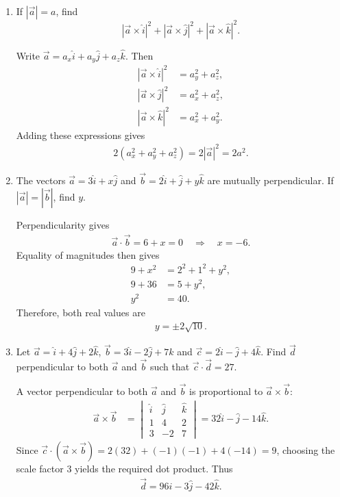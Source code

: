 \begin{enumerate}[label=\thesubsection.\arabic*,ref=\thesubsection.\theenumi]
\item If $|\vec a|=a$, find
\[
 |\vec a\times\hat i|^2+|\vec a\times\hat j|^2+|\vec a\times\hat k|^2.
\]

\solution
Write $\vec a=a_x\hat i+a_y\hat j+a_z\hat k$. Then
\begin{align}
 |\vec a\times\hat i|^2&=a_y^2+a_z^2,\\
 |\vec a\times\hat j|^2&=a_x^2+a_z^2,\\
 |\vec a\times\hat k|^2&=a_x^2+a_y^2.
\end{align}
Adding these expressions gives
\begin{align}
 2(a_x^2+a_y^2+a_z^2)=2|\vec a|^2=\boxed{2a^2}.
\end{align}

\item The vectors $\vec a=3\hat i+x\hat j$ and $\vec b=2\hat i+\hat j+y\hat k$ are mutually perpendicular. If $|\vec a|=|\vec b|$, find $y$.

\solution
Perpendicularity gives
\begin{align}
 \vec a\cdot\vec b=6+x=0\quad\Rightarrow\quad x=-6.
\end{align}
Equality of magnitudes then gives
\begin{align}
 9+x^2&=2^2+1^2+y^2,\\
 9+36&=5+y^2,\\
 y^2&=40.
\end{align}
Therefore, both real values are
\begin{align}
 \boxed{y=\pm2\sqrt{10}}.
\end{align}

\item Let $\vec a=\hat i+4\hat j+2\hat k$, $\vec b=3\hat i-2\hat j+7\hat k$ and $\vec c=2\hat i-\hat j+4\hat k$. Find $\vec d$ perpendicular to both $\vec a$ and $\vec b$ such that $\vec c\cdot\vec d=27$.

\solution
A vector perpendicular to both $\vec a$ and $\vec b$ is proportional to $\vec a\times\vec b$:
\begin{align}
 \vec a\times\vec b&=\begin{vmatrix}\hat i&\hat j&\hat k\\1&4&2\\3&-2&7\end{vmatrix}=32\hat i-\hat j-14\hat k.
\end{align}
Since $\vec c\cdot(\vec a\times\vec b)=2(32)+(-1)(-1)+4(-14)=9$, choosing the scale factor $3$ yields the required dot product. Thus
\begin{align}
 \boxed{\vec d=96\hat i-3\hat j-42\hat k}.
\end{align}


\end{enumerate}
